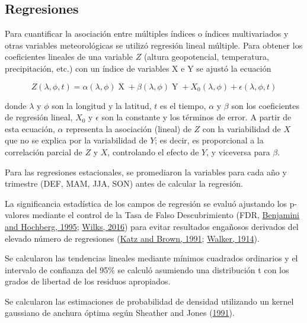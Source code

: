 \documentclass[12pt,oneside,a4paper]{reedthesis}
\begin{document}
\hypertarget{regresiones}{%
\subsection{Regresiones}\label{regresiones}}

Para cuantificar la asociación entre múltiples índices o índices multivariados y otras variables meteorológicas se utilizó regresión lineal múltiple.
Para obtener los coeficientes lineales de una variable \(Z\) (altura geopotencial, temperatura, precipitación, etc.) con un índice de variables X e Y se ajustó la ecuación

\begin{equation}
Z(\lambda, \phi, t) = \alpha(\lambda, \phi) \operatorname{X} + \beta(\lambda, \phi) \operatorname{Y} + X_0(\lambda, \phi) + \epsilon(\lambda, \phi, t)
\label{eq:multiple-regression-sam}
\end{equation}

donde \(\lambda\) y \(\phi\) son la longitud y la latitud, \(t\) es el tiempo, \(\alpha\) y \(\beta\) son los coeficientes de regresión lineal, \(X_0\) y \(\epsilon\) son la constante y los términos de error.
A partir de esta ecuación, \(\alpha\) representa la asociación (lineal) de \(Z\) con la variabilidad de \(X\) que no se explica por la variabilidad de \(Y\); es decir, es proporcional a la correlación parcial de \(Z\) y \(X\), controlando el efecto de \(Y\), y viceversa para \(\beta\).

Para las regresiones estacionales, se promediaron la variables para cada año y trimestre (DEF, MAM, JJA, SON) antes de calcular la regresión.

La significancia estadística de los campos de regresión se evaluó ajustando los p-valores mediante el control de la Tasa de Falso Descubrimiento (FDR, \protect\hyperlink{ref-benjamini1995}{Benjamini and Hochberg, 1995}; \protect\hyperlink{ref-wilks2016}{Wilks, 2016}) para evitar resultados engañosos derivados del elevado número de regresiones (\protect\hyperlink{ref-katz1991}{Katz and Brown, 1991}; \protect\hyperlink{ref-walker1914}{Walker, 1914}).

Se calcularon las tendencias lineales mediante mínimos cuadrados ordinarios y el intervalo de confianza del 95\% se calculó asumiendo una distribución t con los grados de libertad de los residuos apropiados.

Se calcularon las estimaciones de probabilidad de densidad utilizando un kernel gaussiano de anchura óptima según Sheather and Jones (\protect\hyperlink{ref-sheather1991}{1991}).
\end{document}
